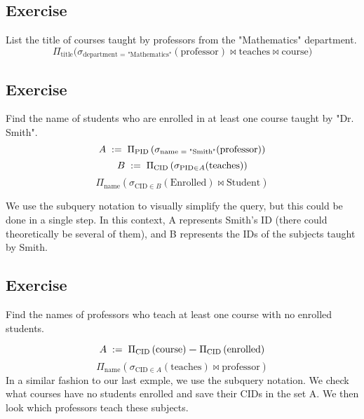\documentclass{article}
\begin{document}
\vspace{4mm}
\subsection{Exercise}
\noindent List the title of courses taught by professors
from the "Mathematics" department. \vspace{1mm}
$$ \Pi_{\text{title}}\Big(
    \sigma_{\text{department = "Mathematics"}}(
        \text{professor}) \Join
    \text{teaches} \Join
    \text{course}
\Big) $$

\vspace{4mm}
\subsection{Exercise}
\noindent Find the name of students who are enrolled in at least
one course taught by "Dr. Smith".
$$ A \hspace{1mm} := \hspace{1mm}
\Pi_{\text{PID}}\left(
    \sigma_{\text{name = "Smith"}}(
        \text{professor})
\right) $$
$$ B \hspace{1mm} := \hspace{1mm}
\Pi_{\text{CID}}\left(
    \sigma_{\text{PID} \in A}(
        \text{teaches})
\right) $$
$$ \Pi_{\text{name}}\left(
    \sigma_{\text{CID} \in B}(
        \text{Enrolled}) \Join
    \text{Student}
\right)$$

\vspace{2mm}
We use the subquery notation to visually
simplify the query, but this could be done in a single step.
In this context, A represents Smith's ID (there could theoretically
be several of them), and B represents the IDs of the subjects taught
by Smith. 

\newpage
\subsection{Exercise}
\noindent Find the names of professors who teach at least one course
with no enrolled students.

$$A \hspace{1mm} := \hspace{1mm}
\Pi_{\text{CID}}\left(\text{course}\right)
\boldsymbol{-}
\Pi_{\text{CID}}\left(\text{enrolled}\right)$$
$$ \Pi_{\text{name}}\left(
    \sigma_{\text{CID} \in A}(
        \text{teaches}) \Join
    \text{professor}
\right)$$
In a similar fashion to our last exmple, we use the subquery notation.
We check what courses have no students enrolled and save their CIDs in
the set A. We then look which professors teach these subjects.
\end{document}
